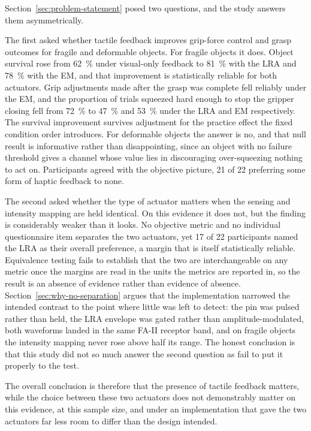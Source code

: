 \documentclass[12pt, a4paper, twoside, openright]{report}
\begin{document}
Section~\ref{sec:problem-statement} posed two questions, and the study answers
them asymmetrically.

The first asked whether tactile feedback improves grip-force control and grasp
outcomes for fragile and deformable objects. For fragile objects it does.
Object survival rose from \SI{62}{\percent} under visual-only feedback to
\SI{81}{\percent} with the LRA and \SI{78}{\percent} with the EM, and that
improvement is statistically reliable for both actuators. Grip adjustments made
after the grasp was complete fell reliably under the EM, and the proportion of
trials squeezed hard enough to stop the gripper closing fell from
\SI{72}{\percent} to \SI{47}{\percent} and \SI{53}{\percent} under the LRA
and EM respectively. The survival improvement survives adjustment for the
practice effect the fixed condition order introduces. For deformable objects
the answer is no, and that null result is informative rather than
disappointing, since an object with no failure threshold gives a channel whose
value lies in discouraging over-squeezing nothing to act on. Participants
agreed with the objective picture, 21 of 22 preferring some form of haptic
feedback to none.

The second asked whether the type of actuator matters when the sensing and
intensity mapping are held identical. On this evidence it does not, but the
finding is considerably weaker than it looks. No objective metric and no
individual questionnaire item separates the two actuators, yet 17 of 22
participants named the LRA as their overall preference, a margin that is itself
statistically reliable. Equivalence testing fails to establish that the two are
interchangeable on any metric once the margins are read in the units the
metrics are reported in, so the result is an absence of evidence rather than
evidence of absence. Section~\ref{sec:why-no-separation} argues that the
implementation narrowed the intended contrast to the point where little was
left to detect: the pin was pulsed rather than held, the LRA envelope was gated
rather than amplitude-modulated, both waveforms landed in the same FA-II
receptor band, and on fragile objects the intensity mapping never rose above
half its range. The honest conclusion is that this study did not so much answer
the second question as fail to put it properly to the test.

The overall conclusion is therefore that the presence of tactile feedback
matters, while the choice between these two actuators does not demonstrably
matter on this evidence, at this sample size, and under an implementation that
gave the two actuators far less room to differ than the design intended.
\end{document}
